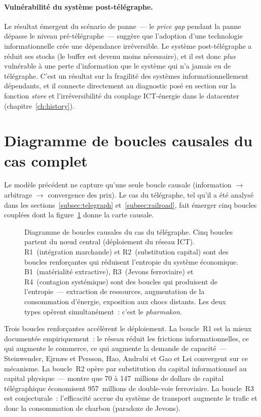 \paragraph{Vulnérabilité du système post-télégraphe.} Le résultat émergent du scénario de panne~--- le \emph{price gap} pendant la panne dépasse le niveau pré-télégraphe~--- suggère que l'adoption d'une technologie informationnelle crée une dépendance irréversible. Le système post-télégraphe a réduit ses stocks (le buffer est devenu moins nécessaire), et il est donc \emph{plus} vulnérable à une perte d'information que le système qui n'a jamais eu de télégraphe. C'est un résultat sur la fragilité des systèmes informationnellement dépendants, et il connecte directement au diagnostic posé en section sur la fonction \emph{store} et l'irréversibilité du couplage ICT-énergie dans le datacenter (chapitre~\ref{ch:history}).


\section{Diagramme de boucles causales du cas complet}\label{sec:sd-cld}

Le modèle précédent ne capture qu'une seule boucle causale (information $\rightarrow$ arbitrage $\rightarrow$ convergence des prix). Le cas du télégraphe, tel qu'il a été analysé dans les sections~\ref{subsec:telegraph} et~\ref{subsec:railroad}, fait émerger cinq boucles couplées dont la figure~\ref{fig:cld-telegraph} donne la carte causale.

\begin{figure}[htbp]
\centering

\caption[Diagramme de boucles causales --- cas du télégraphe]{Diagramme de boucles causales du cas du télégraphe. Cinq boucles partent du n\oe{}ud central (déploiement du réseau ICT). R1~(intégration marchande) et R2~(substitution capital) sont des boucles renforçantes qui réduisent l'entropie du système économique. B1~(matérialité extractive), R3~(Jevons ferroviaire) et R4~(contagion systémique) sont des boucles qui produisent de l'entropie~--- extraction de ressources, augmentation de la consommation d'énergie, exposition aux chocs distants. Les deux types opèrent simultanément~: c'est le \emph{pharmakon}.}\label{fig:cld-telegraph}
\end{figure}

Trois boucles renforçantes accélèrent le déploiement. La boucle~R1 est la mieux documentée empiriquement~: le réseau réduit les frictions informationnelles, ce qui augmente le commerce, ce qui augmente la demande de capacité~--- Steinwender, Ejrnæs et Persson, Hao, Andrabi et Gao et Lei convergent sur ce mécanisme. La boucle~R2 opère par substitution du capital informationnel au capital physique~--- \textcite{field_magnetic_1992} montre que 70 à 147~millions de dollars de capital télégraphique économisent 957~millions de double-voie ferroviaire. La boucle~R3 est conjecturale~: l'efficacité accrue du système de transport augmente le trafic et donc la consommation de charbon (paradoxe de Jevons).

